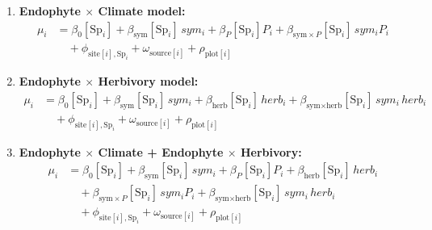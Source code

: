 \documentclass[12pt]{article}\usepackage[]{graphicx}\usepackage[dvipsnames]{xcolor}
\begin{document}
{\begin{enumerate}
    \item \textbf{Endophyte $\times$ Climate model:}
    \begin{align*}
    \mu_i &= \beta_0[\text{Sp}_i] + \beta_{\text{sym}}[\text{Sp}_i]\,sym_i
            + \beta_P[\text{Sp}_i] P_i
            + \beta_{\text{sym}\times P}[\text{Sp}_i]\,sym_i P_i \\
    &\quad + \phi_{\text{site}[i],\text{Sp}_i} + \omega_{\text{source}[i]} + \rho_{\text{plot}[i]}
    \end{align*}

    \item \textbf{Endophyte $\times$ Herbivory model:}
    \begin{align*}
    \mu_i &= \beta_0[\text{Sp}_i] + \beta_{\text{sym}}[\text{Sp}_i]\,sym_i
            + \beta_{\text{herb}}[\text{Sp}_i]\,herb_i
            + \beta_{\text{sym}\times \text{herb}}[\text{Sp}_i]\,sym_i\,herb_i \\
    &\quad + \phi_{\text{site}[i],\text{Sp}_i} + \omega_{\text{source}[i]} + \rho_{\text{plot}[i]}
    \end{align*}

    \item \textbf{Endophyte $\times$ Climate + Endophyte $\times$ Herbivory:}
    \begin{align*}
    \mu_i &= \beta_0[\text{Sp}_i] + \beta_{\text{sym}}[\text{Sp}_i]\,sym_i
            + \beta_P[\text{Sp}_i] P_i
            + \beta_{\text{herb}}[\text{Sp}_i]\,herb_i \\
    &\quad + \beta_{\text{sym}\times P}[\text{Sp}_i]\,sym_i P_i
            + \beta_{\text{sym}\times \text{herb}}[\text{Sp}_i]\,sym_i\,herb_i \\
    &\quad + \phi_{\text{site}[i],\text{Sp}_i} + \omega_{\text{source}[i]} + \rho_{\text{plot}[i]}
    \end{align*}


\end{enumerate}}
\end{document}
